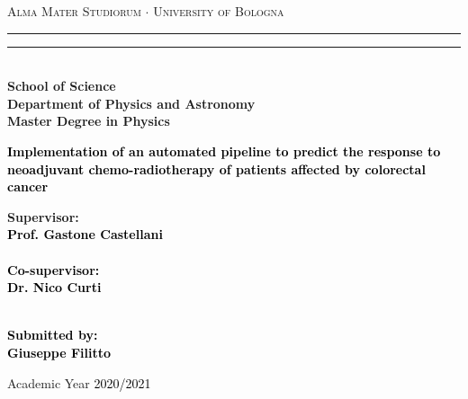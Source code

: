 \begin{titlepage}
    \begin{center}
    {{\Large{\textsc{Alma Mater Studiorum $\cdot$ University of  Bologna}}}} 
    \rule[0.1cm]{15.8cm}{0.1mm}
    \rule[0.5cm]{15.8cm}{0.6mm}
    \\\vspace{3mm}
    {\small{\bf School of Science \\
    Department of Physics and Astronomy\\
    Master Degree in Physics}}
    \end{center}
    
    \vspace{23mm}
    
    \begin{center}\textcolor{black}{
    {\Large{\bf Implementation of an automated pipeline to predict the response to neoadjuvant chemo-radiotherapy of patients affected by colorectal cancer}}
    }\end{center}
    
    \vspace{50mm} \par \noindent
    
    \begin{minipage}[t]{0.47\textwidth}
    {\large{\bf Supervisor: \vspace{2mm}\\\textcolor{black}{
    Prof. Gastone Castellani}\\\\
    \textcolor{black}{
    \bf Co-supervisor: \vspace{2mm}\\Dr. Nico Curti\\\\}}}
    \end{minipage}
    \hfill
    \begin{minipage}[t]{0.47\textwidth}\raggedleft \textcolor{black}{
    {\large{\bf Submitted by:
    \vspace{2mm}\\
    \textcolor{black}{
    Giuseppe Filitto}}}
    }
    \end{minipage}
    
    \vspace{27mm}
    
    \begin{center}
    Academic Year \textcolor{black}{ 2020/2021}
    \end{center}
    
    \end{titlepage}